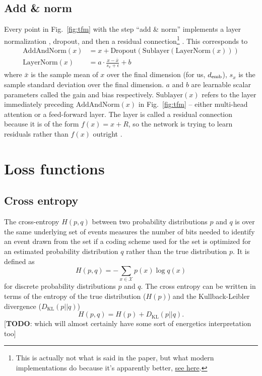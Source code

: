 \documentclass[11pt]{article}
\numberwithin{equation}{section}
\begin{document}
\subsection{Add \& norm} \label{sec:add_and_norm}
Every point in Fig.~\ref{fig:tfm} with the step ``add \& norm'' implements a layer normalization \citep{Ba16}, dropout, and then a residual connection\footnote{This is actually not what is said in the paper, but what modern implementations do because it's apparently better, \href{https://github.com/OpenNMT/OpenNMT-py/issues/770}{see here}.} \citep{He16}. This corresponds to
\begin{align}
\text{AddAndNorm}(x) &= x + \text{Dropout}(\text{Sublayer}(\text{LayerNorm}(x))) \\
\text{LayerNorm}(x) &= a \cdot \frac{x - \bar{x}}{s_x + \epsilon} + b
\end{align}
where $\bar{x}$ is the sample mean of $x$ over the final dimension (for us, $d_{\text{emb}}$), $s_x$ is the sample standard deviation over the final dimension. $a$ and $b$ are learnable scalar parameters called the gain and bias respectively. $\text{Sublayer}(x)$ refers to the layer immediately preceding $\text{AddAndNorm}(x)$ in Fig.~\ref{fig:tfm} -- either multi-head attention or a feed-forward layer. The layer is called a residual connection because it is of the form $f(x) = x + R$, so the network is trying to learn residuals rather than $f(x)$ outright \citep{He16}.


\section{Loss functions}

\subsection{Cross entropy}
The cross-entropy $H(p,q)$ between two probability distributions $p$ and $q$ is over the same underlying set of events measures the number of bits needed to identify an event drawn from the set if a coding scheme used for the set is optimized for an estimated probability distribution $q$ rather than the true distribution $p$. It is defined as 
\begin{equation}
H(p,q) = - \sum_{x \in \mathcal{X}} p(x) \log q(x)
\end{equation}
for discrete probability distributions $p$ and $q$. The cross entropy can be written in terms of the entropy of the true distribution ($H(p)$) and the Kullback-Leibler divergence ($D_{\text{KL}}(p||q)$)
\begin{equation}
H(p,q) = H(p) + D_{\text{KL}}(p||q).
\end{equation}
[\textbf{TODO}: which will almost certainly have some sort of energetics interpretation too] 
\end{document}
